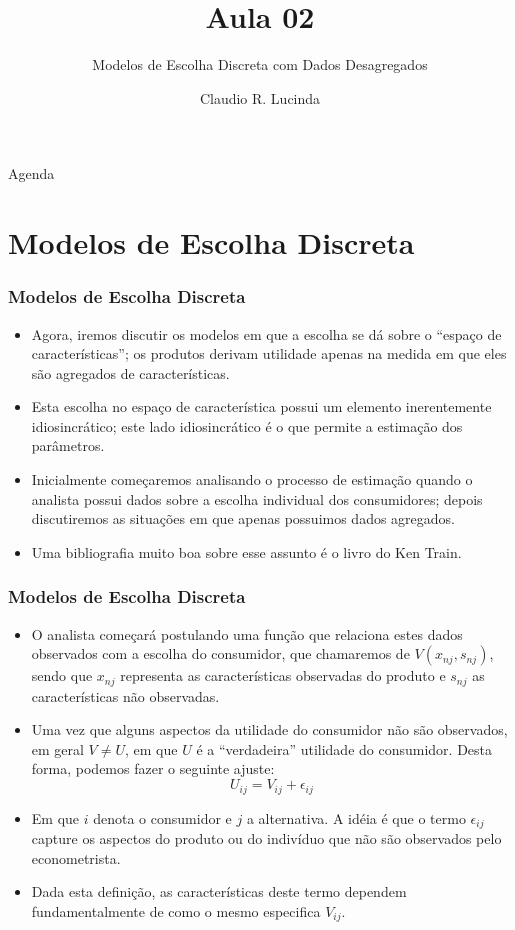 \documentclass{beamer}
\title{Aula 02}
\subtitle{Modelos de Escolha Discreta com Dados Desagregados}
\author{Claudio R. Lucinda}
\institute{FEA-RP/USP}
\date{}
\begin{document}
\frame{\titlepage}
\begin{frame}{Agenda}
  \tableofcontents[pausesections]
\end{frame}


\section{Modelos de Escolha Discreta}

\begin{frame}\frametitle{Modelos de Escolha Discreta}


\begin{itemize}
\item Agora, iremos discutir os modelos em que a escolha se dá sobre o ``espaço
de características''; os produtos derivam utilidade apenas na medida
em que eles são agregados de características. 
\item Esta escolha no espaço de característica possui um elemento inerentemente
idiosincrático; este lado idiosincrático é o que permite a estimação
dos parâmetros.
\item Inicialmente começaremos analisando o processo de estimação quando
o analista possui dados sobre a escolha individual dos consumidores;
depois discutiremos as situações em que apenas possuimos dados agregados.
\item Uma bibliografia muito boa sobre esse assunto é o livro do Ken Train.
\end{itemize}
\end{frame}

\begin{frame}\frametitle{Modelos de Escolha Discreta}


\begin{itemize}
\item O analista começará postulando uma função que relaciona estes dados
observados com a escolha do consumidor, que chamaremos de $V(x_{nj},s_{nj})$,
sendo que $x_{nj}$ representa as características observadas do produto
e $s_{nj}$ as características não observadas.
\item Uma vez que alguns aspectos da utilidade do consumidor não são observados,
em geral $V\neq U$, em que $U$ é a ``verdadeira'' utilidade do
consumidor. Desta forma, podemos fazer o seguinte ajuste:
\[
U_{ij}=V_{ij}+\epsilon_{ij}
\]
\item Em que $i$ denota o consumidor e $j$ a alternativa. A idéia é que
o termo $\epsilon_{ij}$ capture os aspectos do produto ou do indivíduo
que não são observados pelo econometrista. 
\item Dada esta definição, as características deste termo dependem fundamentalmente
de como o mesmo especifica $V_{ij}$. 
\end{itemize}
\end{frame}
\end{document}
